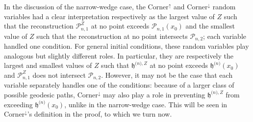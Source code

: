 \documentclass[oneside,final,11pt]{amsart}
\theoremstyle{definition}
\newcommand{\Corner}{\mathrm{Corner}}
\renewcommand{\L}{\CP}
\newcommand{\fh}{\mathfrak{h}}
\newcommand{\h}{\fh^{{\scriptscriptstyle(}n{\scriptscriptstyle)}}}
\newcommand{\hz}[1]{\fh^{{\scriptscriptstyle(}n{\scriptscriptstyle)},#1}}
\newcommand{\1}[1]{\mathbf{1}_{#1}}
\newcommand{\CP}{\mathcal{P}}
\numberwithin{equation}{section}
\begin{document}
In the discussion of the narrow-wedge case, the $\Corner^\uparrow$ and $\Corner^\downarrow$ random variables had a clear interpretation respectively as the largest value of $Z$ such that the reconstruction $\L_{n,1}^{Z}$ at no point exceeds $\L_{n,1}(x_0)$ and the smallest value of $Z$ such that the reconstruction at no point intersects $\L_{n,2}$; each variable handled one condition. For general initial conditions, these random variables play analogous but slightly different roles. In particular, they are respectively the largest and smallest values of $Z$ such that $\hz{Z}$ at no point exceeds $\h(x_0)$ and $\L_{n,1}^Z$ does not intersect $\L_{n,2}$.
However, it may not be the case that each variable separately handles one of the conditions: because of a larger class of possible geodesic paths, $\Corner^{\downarrow}$ may also play a role in preventing $\hz{Z}$ from exceeding $\h(x_0)$, unlike in the narrow-wedge case. This will be seen in $\Corner^{\downarrow}$'s definition in the proof, to which we turn  now.
\end{document}

